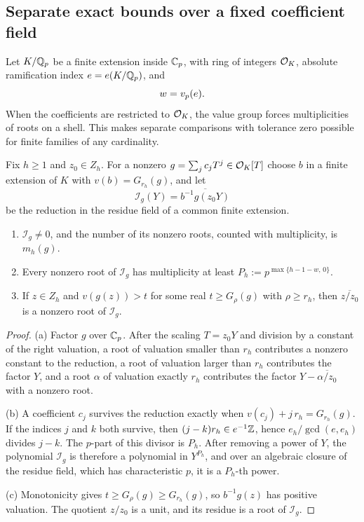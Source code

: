 \subsection{Separate exact bounds over a fixed coefficient field}\label{tors:sec:fixedfield}

Let $K/\mathbb{Q}_p$ be a finite extension inside $\mathbb{C}_p$, with ring of integers $\mathcal{O}_K$, absolute
ramification index $e=e(K/\mathbb{Q}_p)$, and
\[
  w=v_p(e) .
\]
When the coefficients are restricted to $\mathcal{O}_K$, the value group forces multiplicities of
roots on a shell. This makes separate comparisons with tolerance zero possible for
finite families of any cardinality.

\begin{lemma}\label{tors:lem:residual}
Fix $h\ge1$ and $z_0\in Z_h$. For a nonzero $g=\sum_jc_jT^j\in\mathcal{O}_K[T]$ choose $b$ in a
finite extension of $K$ with $v(b)=G_{r_h}(g)$, and let
\[
  \mathcal I_g(Y)=\overline{b^{-1}g(z_0Y)}
\]
be the reduction in the residue field of a common finite extension.
\begin{enumerate}[label=\textup{(\alph*)}]
\item $\mathcal I_g\ne0$, and the number of its nonzero roots, counted with multiplicity,
  is $m_h(g)$.
\item Every nonzero root of $\mathcal I_g$ has multiplicity at least
  $P_h:=p^{\max\{h-1-w,\,0\}}$.
\item If $z\in Z_h$ and $v(g(z))>t$ for some real $t\ge G_\rho(g)$ with $\rho\ge r_h$,
  then $\overline{z/z_0}$ is a nonzero root of $\mathcal I_g$.
\end{enumerate}
\end{lemma}

\begin{proof}
(a) Factor $g$ over $\mathbb{C}_p$. After the scaling $T=z_0Y$ and division by a constant of the
right valuation, a root of valuation smaller than $r_h$ contributes a nonzero constant
to the reduction, a root of valuation larger than $r_h$ contributes the factor $Y$, and
a root $\alpha$ of valuation exactly $r_h$ contributes the factor
$Y-\overline{\alpha/z_0}$ with a nonzero root.

(b) A coefficient $c_j$ survives the reduction exactly when
$v(c_j)+j\,r_h=G_{r_h}(g)$. If the indices $j$ and $k$ both survive, then
$(j-k)r_h\in e^{-1}\mathbb{Z}$, hence $e_h/\gcd(e,e_h)$ divides $j-k$. The $p$-part of this
divisor is $P_h$. After removing a power of $Y$, the polynomial $\mathcal I_g$ is
therefore a polynomial in $Y^{P_h}$, and over an algebraic closure of the residue field,
which has characteristic $p$, it is a $P_h$-th power.

(c) Monotonicity gives $t\ge G_\rho(g)\ge G_{r_h}(g)$, so $b^{-1}g(z)$ has positive
valuation. The quotient $z/z_0$ is a unit, and its residue is a root of $\mathcal I_g$.
\end{proof}


